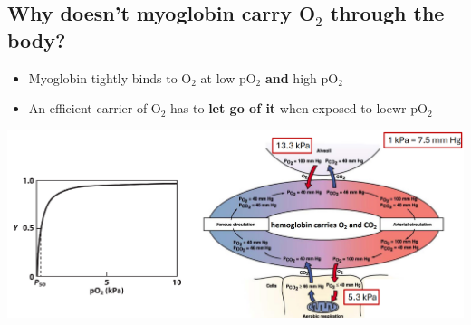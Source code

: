 \documentclass[10pt]{article}
\begin{document}
\subsection*{Why doesn't myoglobin carry O$_2$ through the body?}
\begin{itemize}
    \item Myoglobin tightly binds to O$_2$ at low pO$_2$ \textbf{and} high pO$_2$
    \item An efficient carrier of O$_2$ has to \textbf{let go of it} when exposed to loewr pO$_2$
\end{itemize}
\begin{center}
    \includegraphics*[width=\textwidth]{L2_12.png}
\end{center}
\end{document}
